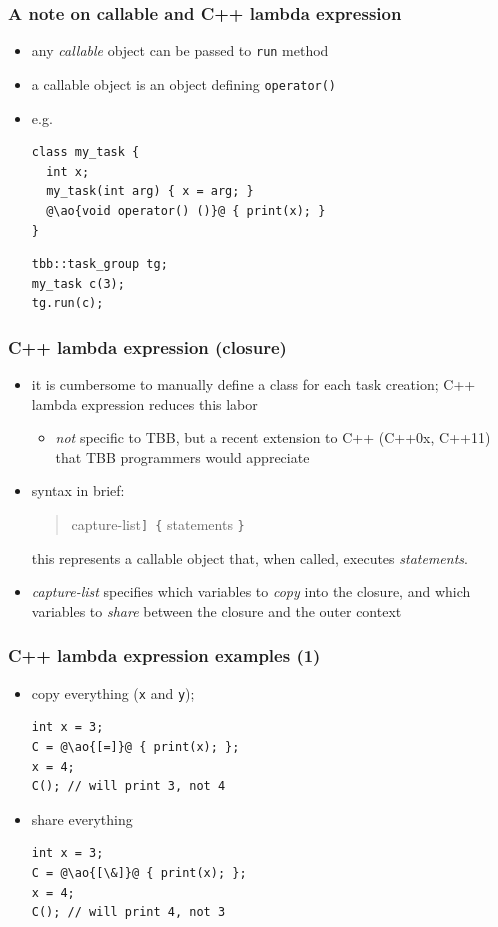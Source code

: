 \documentclass[12pt,dvipdfmx]{beamer}
\newcommand{\ao}[1]{{\color{blue}#1}}
\begin{document}
\begin{frame}[fragile]
\frametitle{A note on callable and C++ lambda expression}
\begin{itemize}
\item any {\em callable} object can be passed to {\tt run} method
\item a callable object is an object defining {\tt operator()}
\item e.g.
\begin{lstlisting}
class my_task {
  int x;
  my_task(int arg) { x = arg; }
  @\ao{void operator() ()}@ { print(x); }
}    
\end{lstlisting}
\begin{lstlisting}
tbb::task_group tg;
my_task c(3);
tg.run(c);
\end{lstlisting}
\end{itemize}
\end{frame}

\begin{frame}
\frametitle{C++ lambda expression (closure)}
\begin{itemize}
\item it is cumbersome to manually define a class
  for each task creation; C++ lambda expression
  reduces this labor

  \begin{itemize}
  \item {\em not} specific to TBB, but a
    recent extension to C++ (C++0x, C++11) that
    TBB programmers would appreciate
  \end{itemize}

\item syntax in brief:
\begin{quote}
\ao{{\tt [}capture-list{\tt ] \{} statements {\tt \}}}
\end{quote}
this represents a callable object that, when called,
executes \ao{\em statements}.

\item \ao{\em capture-list} specifies which
  variables to {\em copy} into the
  closure, and which variables to {\em
    share} between the closure and the outer context

\end{itemize}
\end{frame}

\begin{frame}[fragile]
\frametitle{C++ lambda expression examples (1)}
\begin{itemize}
\item copy everything ({\tt x} and {\tt y});
\begin{lstlisting}
int x = 3;
C = @\ao{[=]}@ { print(x); };
x = 4;
C(); // will print 3, not 4
\end{lstlisting}

\item share everything
\begin{lstlisting}
int x = 3;
C = @\ao{[\&]}@ { print(x); };
x = 4;
C(); // will print 4, not 3
\end{lstlisting}
\end{itemize}
\end{frame}
\end{document}
